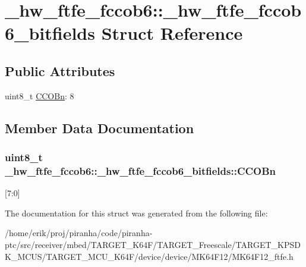 \hypertarget{struct__hw__ftfe__fccob6_1_1__hw__ftfe__fccob6__bitfields}{}\section{\+\_\+hw\+\_\+ftfe\+\_\+fccob6\+:\+:\+\_\+hw\+\_\+ftfe\+\_\+fccob6\+\_\+bitfields Struct Reference}
\label{struct__hw__ftfe__fccob6_1_1__hw__ftfe__fccob6__bitfields}
\subsection*{Public Attributes}
\begin{DoxyCompactItemize}
\item 
uint8\+\_\+t \hyperlink{struct__hw__ftfe__fccob6_1_1__hw__ftfe__fccob6__bitfields_accf8a51fe637f3096c3de84de20adea0}{C\+C\+O\+Bn}\+: 8
\end{DoxyCompactItemize}


\subsection{Member Data Documentation}
\subsubsection[{\texorpdfstring{C\+C\+O\+Bn}{CCOBn}}]{\setlength{\rightskip}{0pt plus 5cm}uint8\+\_\+t \+\_\+hw\+\_\+ftfe\+\_\+fccob6\+::\+\_\+hw\+\_\+ftfe\+\_\+fccob6\+\_\+bitfields\+::\+C\+C\+O\+Bn}\hypertarget{struct__hw__ftfe__fccob6_1_1__hw__ftfe__fccob6__bitfields_accf8a51fe637f3096c3de84de20adea0}{}\label{struct__hw__ftfe__fccob6_1_1__hw__ftfe__fccob6__bitfields_accf8a51fe637f3096c3de84de20adea0}
\mbox{[}7\+:0\mbox{]} 

The documentation for this struct was generated from the following file\+:\begin{DoxyCompactItemize}
\item 
/home/erik/proj/piranha/code/piranha-\/ptc/src/receiver/mbed/\+T\+A\+R\+G\+E\+T\+\_\+\+K64\+F/\+T\+A\+R\+G\+E\+T\+\_\+\+Freescale/\+T\+A\+R\+G\+E\+T\+\_\+\+K\+P\+S\+D\+K\+\_\+\+M\+C\+U\+S/\+T\+A\+R\+G\+E\+T\+\_\+\+M\+C\+U\+\_\+\+K64\+F/device/device/\+M\+K64\+F12/M\+K64\+F12\+\_\+ftfe.\+h\end{DoxyCompactItemize}
